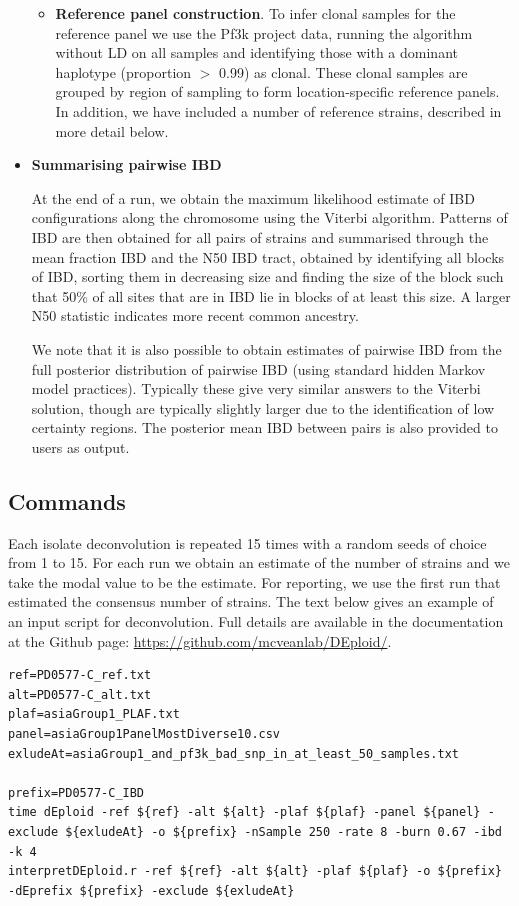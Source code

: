 \documentclass[9pt]{article}
\begin{document}
\begin{itemize}
\begin{itemize}
\item {\bf Reference panel construction}. To infer clonal samples for the reference panel we use the Pf3k project data, running the algorithm without LD on all samples and identifying those with a dominant haplotype (proportion $>$ 0.99) as clonal.  These clonal samples are grouped by region of sampling to form location-specific reference panels.  In addition, we have included a number of reference strains, described in more detail below.

\end{itemize}

\item {\bf Summarising pairwise IBD}

At the end of a run, we obtain the maximum likelihood estimate of IBD configurations along the chromosome using the Viterbi algorithm.  Patterns of IBD are then obtained for all pairs of strains and summarised through the mean fraction IBD and the N50 IBD tract, obtained by identifying all blocks of IBD, sorting them in decreasing size and finding the size of the block such that 50\% of all sites that are in IBD lie in blocks of at least this size.  A larger N50 statistic indicates more recent common ancestry.

We note that it is also possible to obtain estimates of pairwise IBD from the full posterior distribution of pairwise IBD (using standard hidden Markov model practices).  Typically these give very similar answers to the Viterbi solution, though are typically slightly larger due to the identification of low certainty regions.  The posterior mean IBD between pairs is also provided to users as output.

\end{itemize}




\subsection{Commands}
Each isolate deconvolution is repeated 15 times with a random seeds of choice from 1 to 15. For each run we obtain an estimate of the number of strains and we take the modal value to be the estimate.  For reporting, we use the first run that estimated the consensus number of strains.  The text below gives an example of an input script for deconvolution.  Full details are available in the documentation at the Github page: \url{https://github.com/mcveanlab/DEploid/}.
\linespread{1}
\begin{lstlisting}
ref=PD0577-C_ref.txt
alt=PD0577-C_alt.txt
plaf=asiaGroup1_PLAF.txt
panel=asiaGroup1PanelMostDiverse10.csv
exludeAt=asiaGroup1_and_pf3k_bad_snp_in_at_least_50_samples.txt

prefix=PD0577-C_IBD
time dEploid -ref ${ref} -alt ${alt} -plaf ${plaf} -panel ${panel} -exclude ${exludeAt} -o ${prefix} -nSample 250 -rate 8 -burn 0.67 -ibd -k 4
interpretDEploid.r -ref ${ref} -alt ${alt} -plaf ${plaf} -o ${prefix} -dEprefix ${prefix} -exclude ${exludeAt}
\end{lstlisting}
\end{document}
